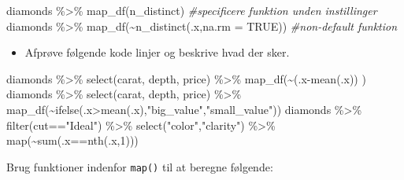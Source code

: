 \documentclass[
]{book}
\newenvironment{Shaded}{\begin{snugshade}}{\end{snugshade}}
\newcommand{\AttributeTok}[1]{\textcolor[rgb]{0.77,0.63,0.00}{#1}}
\newcommand{\CommentTok}[1]{\textcolor[rgb]{0.56,0.35,0.01}{\textit{#1}}}
\newcommand{\ConstantTok}[1]{\textcolor[rgb]{0.00,0.00,0.00}{#1}}
\newcommand{\DecValTok}[1]{\textcolor[rgb]{0.00,0.00,0.81}{#1}}
\newcommand{\FunctionTok}[1]{\textcolor[rgb]{0.00,0.00,0.00}{#1}}
\newcommand{\NormalTok}[1]{#1}
\newcommand{\SpecialCharTok}[1]{\textcolor[rgb]{0.00,0.00,0.00}{#1}}
\newcommand{\StringTok}[1]{\textcolor[rgb]{0.31,0.60,0.02}{#1}}
\providecommand{\tightlist}{%
  \setlength{\itemsep}{0pt}\setlength{\parskip}{0pt}}
\begin{document}
\begin{Shaded}
\begin{Highlighting}[]
\NormalTok{diamonds }\SpecialCharTok{\%\textgreater{}\%} \FunctionTok{map\_df}\NormalTok{(n\_distinct) }\CommentTok{\#specificere funktion unden instillinger}
\NormalTok{diamonds }\SpecialCharTok{\%\textgreater{}\%} \FunctionTok{map\_df}\NormalTok{(}\SpecialCharTok{\textasciitilde{}}\FunctionTok{n\_distinct}\NormalTok{(.x,}\AttributeTok{na.rm =} \ConstantTok{TRUE}\NormalTok{)) }\CommentTok{\#non{-}default funktion}
\end{Highlighting}
\end{Shaded}

\begin{itemize}
\tightlist
\item
  Afprøve følgende kode linjer og beskrive hvad der sker.
\end{itemize}

\begin{Shaded}
\begin{Highlighting}[]
\NormalTok{diamonds }\SpecialCharTok{\%\textgreater{}\%} \FunctionTok{select}\NormalTok{(carat, depth, price) }\SpecialCharTok{\%\textgreater{}\%} \FunctionTok{map\_df}\NormalTok{(}\SpecialCharTok{\textasciitilde{}}\NormalTok{(.x}\SpecialCharTok{{-}}\FunctionTok{mean}\NormalTok{(.x)) )}
\NormalTok{diamonds }\SpecialCharTok{\%\textgreater{}\%} \FunctionTok{select}\NormalTok{(carat, depth, price) }\SpecialCharTok{\%\textgreater{}\%} \FunctionTok{map\_df}\NormalTok{(}\SpecialCharTok{\textasciitilde{}}\FunctionTok{ifelse}\NormalTok{(.x}\SpecialCharTok{\textgreater{}}\FunctionTok{mean}\NormalTok{(.x),}\StringTok{"big\_value"}\NormalTok{,}\StringTok{"small\_value"}\NormalTok{))}
\NormalTok{diamonds }\SpecialCharTok{\%\textgreater{}\%} \FunctionTok{filter}\NormalTok{(cut}\SpecialCharTok{==}\StringTok{"Ideal"}\NormalTok{) }\SpecialCharTok{\%\textgreater{}\%} \FunctionTok{select}\NormalTok{(}\StringTok{"color"}\NormalTok{,}\StringTok{"clarity"}\NormalTok{) }\SpecialCharTok{\%\textgreater{}\%} \FunctionTok{map}\NormalTok{(}\SpecialCharTok{\textasciitilde{}}\FunctionTok{sum}\NormalTok{(.x}\SpecialCharTok{==}\FunctionTok{nth}\NormalTok{(.x,}\DecValTok{1}\NormalTok{)))}
\end{Highlighting}
\end{Shaded}

Brug funktioner indenfor \texttt{map()} til at beregne følgende:
\end{document}

